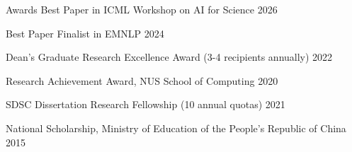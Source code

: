 \begin{rSection}{Awards}
Best Paper in ICML Workshop on AI for Science \hfill {2026}

Best Paper Finalist in EMNLP \hfill {2024}

Dean's Graduate Research Excellence Award (3-4 recipients annually) \hfill {2022}

Research Achievement Award, NUS School of Computing \hfill {2020}

SDSC Dissertation Research Fellowship (10 annual quotas) \hfill {2021}

National Scholarship, Ministry of Education of the People's Republic of China \hfill {2015}

\end{rSection}
